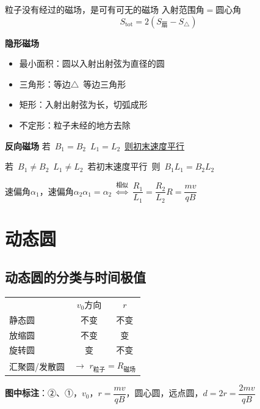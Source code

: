 粒子没有经过的磁场，是可有可无的磁场
入射范围角$=$圆心角
\[ S_{\mathrm{tot}}=2\left(S_{\text{扇}}-S_{\triangle}\right) \]

\textbf{隐形磁场}
\begin{itemize}
\item 最小面积：圆\quad 以入射出射弦为直径的圆
\item 三角形：等边$\triangle$\ 等边三角形
\item 矩形：入射出射弦为长，切弧成形
\item 不定形：粒子未经的地方去除
\end{itemize}

\textbf{反向磁场}
若\ $B_1=B_2$\ $L_1=L_2$\ \underline{则初末速度平行}

若\ $B_1\ne B_2$\ $L_1\ne L_2$\ 若初末速度平行\ 则\ \underline{$B_1L_1=B_2L_2$}

速偏角$\alpha_1$，速偏角$\alpha_2$\quad $\alpha_1=\alpha_2\ \overset{\text{相似}}{\Longleftrightarrow}\ \dfrac{R_1}{L_1}=\dfrac{R_2}{L_2}$\quad $R=\dfrac{mv}{qB}$


\section{动态圆}
\subsection{动态圆的分类与时间极值}
\begin{center}
\begin{tabular}{lcc}
 & $v_0$方向 & $r$\\
静态圆 & 不变 & 不变\\
放缩圆 & 不变 & 变\\
旋转圆 & 变 & 不变\\
汇聚圆/发散圆 & \multicolumn{2}{l}{$\to$ $r_{\text{粒子}}=R_{\text{磁场}}$}
\end{tabular}
\end{center}
\textbf{图中标注}：②、①，$v_0$，$r=\dfrac{mv}{qB}$，圆心圆，远点圆，$d=2r=\dfrac{2mv}{qB}$

